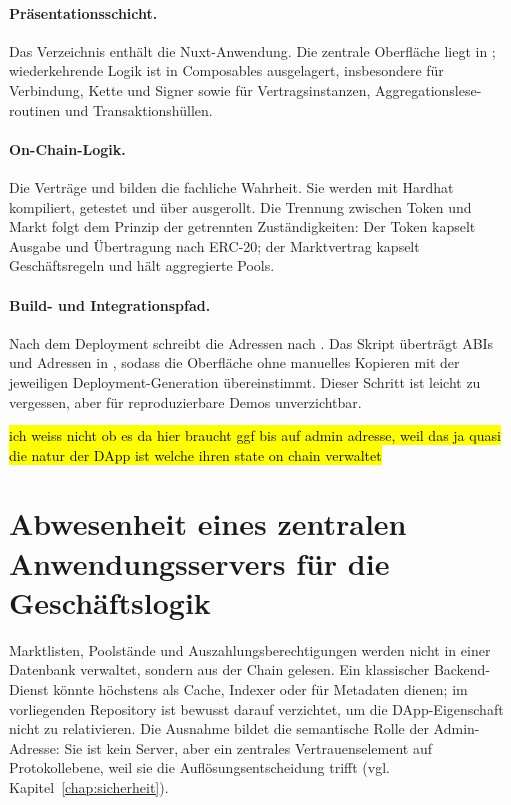 \paragraph{Präsentationsschicht.}
Das Verzeichnis  enthält die Nuxt-Anwendung. Die zentrale
Oberfläche liegt in ; wiederkehrende Logik ist in
Composables ausgelagert, insbesondere  für Verbindung, Kette
und Signer sowie  für Vertragsinstanzen, Aggregationslese-
routinen und Transaktionshüllen.

\paragraph{On-Chain-Logik.}
Die Verträge  und
 bilden die fachliche Wahrheit. Sie werden
mit Hardhat kompiliert, getestet und über  ausgerollt.
Die Trennung zwischen Token und Markt folgt dem Prinzip der getrennten
Zuständigkeiten: Der Token kapselt Ausgabe und Übertragung nach ERC-20; der
Marktvertrag kapselt Geschäftsregeln und hält aggregierte Pools.

\paragraph{Build- und Integrationspfad.}
Nach dem Deployment schreibt  die Adressen nach
. Das Skript 
überträgt ABIs und Adressen in , sodass die
Oberfläche ohne manuelles Kopieren mit der jeweiligen Deployment-Generation
übereinstimmt. Dieser Schritt ist leicht zu vergessen, aber für reproduzierbare
Demos unverzichtbar.

\hl{ich weiss nicht ob es da hier braucht ggf bis auf admin adresse, weil das ja quasi die natur der DApp ist welche ihren state on chain verwaltet}
\section{Abwesenheit eines zentralen Anwendungsservers für die Geschäftslogik}

Marktlisten, Poolstände und Auszahlungsberechtigungen werden nicht in einer
Datenbank verwaltet, sondern aus der Chain gelesen. Ein klassischer Backend-Dienst
könnte höchstens als Cache, Indexer oder für Metadaten dienen; im vorliegenden
Repository ist bewusst darauf verzichtet, um die DApp-Eigenschaft nicht zu
relativieren. Die Ausnahme bildet die semantische Rolle der Admin-Adresse: Sie ist
kein Server, aber ein zentrales Vertrauenselement auf Protokollebene, weil sie
die Auflösungsentscheidung trifft (vgl. Kapitel~\ref{chap:sicherheit}).

